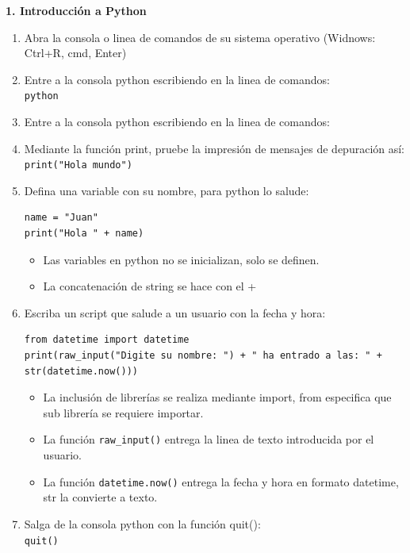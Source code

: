 \documentclass[10pt,letterpaper]{article}
\begin{document}
\begin{center}
\textbf{1. Introducción a Python}
\end{center}

\begin{enumerate}
\item Abra la consola o linea de comandos de su sistema operativo (Widnows: Ctrl+R, cmd, Enter)
\item Entre a la consola python escribiendo en la linea de comandos:\\
\verb+python+
\item Entre a la consola python escribiendo en la linea de comandos:\\

\item Mediante la función print, pruebe la impresión de mensajes de depuración así:\\
\verb+print("Hola mundo")+

\item Defina una variable con su nombre, para python lo salude:
\begin{verbatim}
name = "Juan"
print("Hola " + name)
\end{verbatim}
\begin{itemize}
\item Las variables en python no se inicializan, solo se definen.
\item La concatenación de string se hace con el +
\end{itemize}

\item Escriba un script que salude a un usuario con la fecha y hora:
\begin{verbatim}
from datetime import datetime
print(raw_input("Digite su nombre: ") + " ha entrado a las: " + str(datetime.now()))
\end{verbatim}
\begin{itemize}
\item La inclusión de librerías se realiza mediante import, from especifica que sub librería se requiere importar.
\item La función \verb+raw_input()+ entrega la linea de texto introducida por el usuario.
\item La función \verb+datetime.now()+ entrega la fecha y hora en formato datetime, str la convierte a texto.
\end{itemize}

\item Salga de la consola python con la función quit():\\
\verb|quit()|



\end{enumerate}
\end{document}
